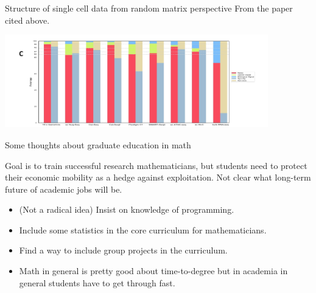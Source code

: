 \documentclass{beamer}
\begin{document}
\begin{frame}{Structure of single cell data from random matrix perspective}
From the paper cited above.
\begin{center}
\includegraphics[width=4.5in]{RMT1.png} 
\end{center}
\end{frame}


\begin{frame}{Some thoughts about graduate education in math}

  Goal is to train successful research mathematicians, but students need to protect their economic mobility as a hedge against exploitation.  Not clear what long-term future of academic jobs will be.

  \begin{itemize}
  \item (Not a radical idea) Insist on knowledge of programming.
    \item Include some statistics in the core curriculum for mathematicians.
      \item Find a way to include group projects in the curriculum.
      \item Math in general is pretty good about time-to-degree but in academia in general students have to get through fast.
      \end{itemize}
      \end{frame}
  
\end{document}
